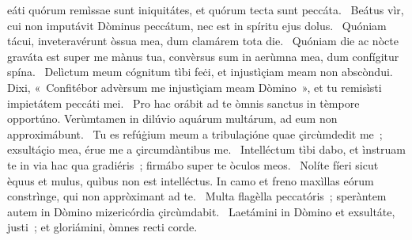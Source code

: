 { }
{%
eáti quórum remìssae sunt iniquitátes, et quórum tecta sunt peccáta. 
~Beátus vìr, cui non imputávit Dòminus peccátum, nec est in spíritu ejus dolus. 
~Quóniam tácui, inveteravérunt òssua mea, dum clamárem tota die. 
~Quóniam die ac nòcte graváta est super me mànus tua, convèrsus sum in aerùmna mea, dum confígitur spína. 
~Delìctum meum cógnitum tìbi feċi, et injustìçiam meam non abscòndui. Dixi, «~Confitébor advèrsum me injustìçiam meam Dòmino~», et tu remisìsti impietátem peccáti mei. 
~Pro hac orábit ad te òmnis sanctus in tèmpore opportúno. Verùmtamen in dilúvio aquárum multárum, ad eum non approximábunt. 
~Tu es refúġium meum a tribulaçióne quae çircùmdedit me~; exsultáçio mea, érue me a çircumdàntibus me. 
~Intelléctum tìbi dabo, et ìnstruam te in via hac qua gradiéris~; firmábo super te òculos meos. 
~Nolíte fíeri sicut èquus et mulus, quìbus non est intelléctus. In camo et freno maxìllas eórum constrìnge, qui non appròximant ad te. 
~Multa flagèlla peccatóris~; speràntem autem in Dòmino mizericórdia çircùmdabit. 
~Laetámini in Dòmino et exsultáte, justi~; et gloriámini, òmnes recti corde. 
}
